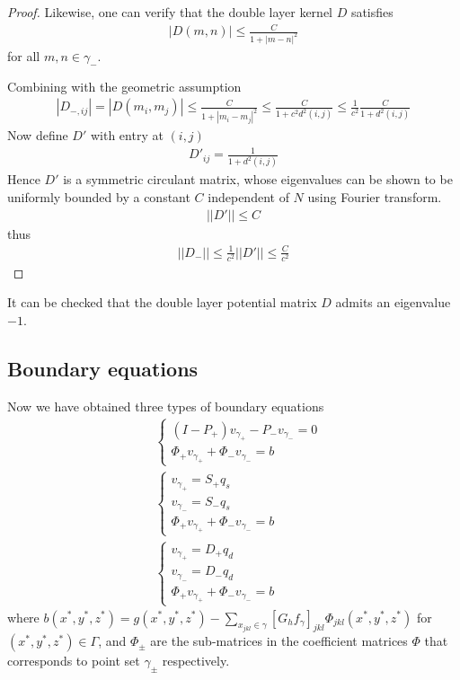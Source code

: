 \begin{proof}
Likewise, one can verify that the double layer kernel $D$ satisfies
\begin{align}
|D(m,n)|\leq \frac{C}{1+|m-n|^2}
\end{align}
for all $m,n\in\gamma_-$.

Combining with the geometric assumption
\begin{align}
|D_{-,ij}| = |D(m_i,m_j)|\leq \frac{C}{1+|m_i-m_j|^2}\leq \frac{C}{1+c^2d^2(i,j)}\leq \frac{1}{c^2}\frac{C}{1+d^2(i,j)}
\end{align}
Now define $D'$ with entry at $(i,j)$
\begin{align}
D'_{ij}=\frac{1}{1+d^2(i,j)}
\end{align}
Hence $D'$ is a symmetric circulant matrix, whose eigenvalues can be shown to be uniformly bounded by a constant $C$ independent of $N$ using Fourier transform.
\begin{align}
||D'||\leq C
\end{align}
thus
\begin{align}
||D_-||\leq \frac{1}{c^2}||D'||\leq \frac{C}{c^2} 
\end{align}
\end{proof}

\begin{remark}
It can be checked that the double layer potential matrix $D$ admits an eigenvalue $-1$.
\end{remark}

\subsection{Boundary equations}

Now we have obtained three types of boundary equations
\begin{subequations}
\begin{align}
&\left\{
\begin{array}{r}
(I - P_+)v_{\gamma_+} - P_{-}v_{\gamma_-}=0\\
\Phi_+v_{\gamma_+} + \Phi_{-}v_{\gamma_-}=b
\end{array}
\right.\label{eqn:direct_sys}\\
&\left\{
\begin{array}{r}
v_{\gamma_+} =S_{+}q_{s}\\
v_{\gamma_-} =S_{-}q_{s}\\
\Phi_+v_{\gamma_+} + \Phi_{-}v_{\gamma_-}=b
\end{array}
\right.\label{eqn:single_sys}\\
&\left\{
\begin{array}{r}
v_{\gamma_+} =D_{+}q_{d}\\
v_{\gamma_-} =D_{-}q_{d}\\
\Phi_+v_{\gamma_+} + \Phi_{-}v_{\gamma_-}=b
\end{array}\label{eqn:double_sys}
\right.
\end{align}
\end{subequations}
where $b(x^*,y^*,z^*)=g(x^*,y^*,z^*)-\sum_{x_{jkl}\in\gamma}[G_hf_{\gamma}]_{jkl} \Phi_{jkl}(x^*,y^*,z^*)$ for $(x^*,y^*,z^*)\in\Gamma$, and $\Phi_\pm$ are the sub-matrices in the coefficient matrices $\Phi$ that corresponds to point set $\gamma_\pm$ respectively.

